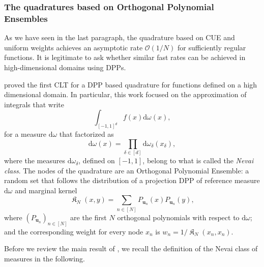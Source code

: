 \documentclass[twoside,11pt]{book}
\DeclareMathOperator*{\KDPP}{\mathfrak{K}}
\begin{document}
\subsubsection{The quadratures based on Orthogonal Polynomial Ensembles}
As we have seen in the last paragraph, the quadrature based on CUE and uniform weights achieves an asymptotic rate $\mathcal{O}(1/N)$ for sufficiently regular functions. It is legitimate to ask whether similar fast rates can be achieved in high-dimensional domains using DPPs.



\cite{BaHa16} proved the first CLT for a DPP based quadrature for functions defined on a high dimensional domain. In particular,  this work focused on the approximation of integrals that write
\begin{equation}
\int_{[-1,1]^{d}} f(x) \mathrm{d}\omega(x),
\end{equation}
for a measure $\mathrm{d}\omega$ that  factorized as
\begin{equation}
\mathrm{d}\omega(x) = \prod\limits_{\delta \in [d]} \mathrm{d}\omega_{\delta}(x_{\delta}),
\end{equation}
where the measures $\mathrm{d}\omega_{\delta}$, defined on $[-1,1]$, belong to what is called the \emph{Nevai class}. The nodes of the quadrature are an Orthogonal Polynomial Ensemble: a random set that follows the distribution of a projection DPP of reference measure $\mathrm{d}\omega$ and marginal kernel
\begin{equation}
\KDPP_{N}(x,y) = \sum\limits_{n \in [N]} P_{\bm{u}_{n}}(x)P_{\bm{u}_{n}}(y),
\end{equation}
where $(P_{\bm{u}_{n}})_{n \in [N]}$ are the first $N$ orthogonal polynomials with respect to $\mathrm{d}\omega$; and the corresponding weight for every node $x_{n}$ is $\displaystyle w_{n} =1/\KDPP_{N}(x_{n},x_{n})$.

Before we review the main result of \citep{BaHa16}, we recall the definition of the Nevai class of measures in the following.
\end{document}
